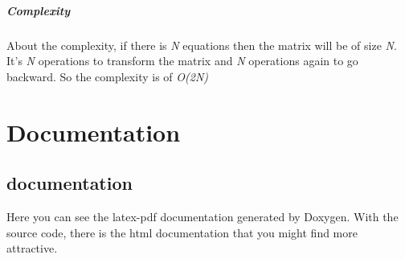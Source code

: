 \documentclass[12pt, a4paper]{report}
\begin{document}
\begin{appendix}
\paragraph{Complexity}About the complexity, if there is \textit{N} equations then the matrix will be of size \textit{N}. It's \textit{N} operations to transform the matrix and \textit{N} operations again to go backward. So the complexity is of \textit{O(2N)} 
\end{appendix}
\chapter{Documentation}
\section{documentation} Here you can see the latex-pdf documentation generated by Doxygen. With the source code, there is the html documentation that you might find more attractive.

\end{document}

